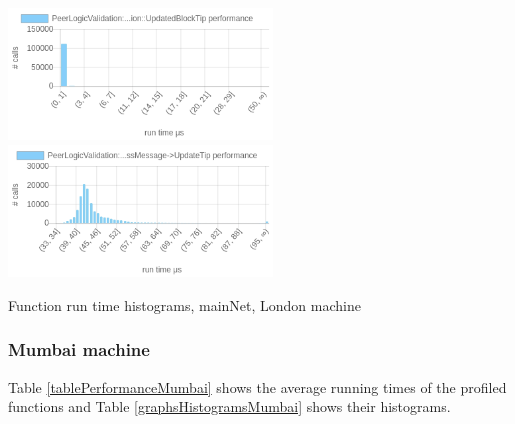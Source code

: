 \documentclass{article}
\begin{document}
\begin{table}
	\includegraphics[width=7cm]{images/london/chartPeerLogicValidation_3A_3AProcessMessages-_3EProcessMessage-_3EPeerLogicValidation_3A_3AUpdatedBlockTip.png}
	\includegraphics[width=7cm]{images/london/chartPeerLogicValidation_3A_3AProcessMessages-_3EProcessMessage-_3EUpdateTip.png}
	\caption{\label{graphsHistogramsLondon} Function run time histograms, mainNet, London machine}
\end{table}






\subsubsection{Mumbai machine}
Table  \ref{tablePerformanceMumbai} shows the average running times of the profiled functions and Table \ref{graphsHistogramsMumbai} shows their histograms.
\end{document}
